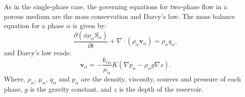 \documentclass[12pt]{article}
\begin{document}
As in the single-phase case, the governing equations for two-phase flow in a porous medium are the mass conservation and Darcy's law. 
The mass balance equation for a phase $\alpha$ is given by:
\begin{equation}\label{eq:mb2ph}
 \frac{\partial(\phi \rho_{\alpha}S_{\alpha})}{\partial t}+\nabla \cdot ( \rho_{\alpha} \mathbf{v}_{\alpha})=\rho_{\alpha} q_{\alpha},
\end{equation}
and Darcy's law reads:
\begin{equation}\label{eq:D2ph}
\mathbf{v}_{\alpha}=-\frac{k_{r\alpha}}{\mu_{\alpha}} {K}(\nabla p_{\alpha}-\rho_{\alpha} g \nabla z).
\end{equation}
Where, $\rho_{\alpha}$, $\mu_{\alpha}$, $q_{\alpha}$ and $p_{\alpha}$ are the density, viscosity, sources and pressure of each phase, $g$ is the gravity constant, and $z$ is the depth of the reservoir.   \\
\end{document}
